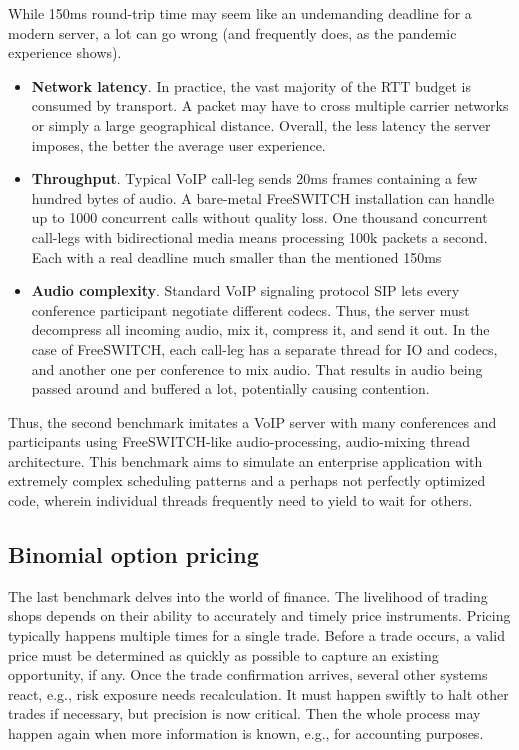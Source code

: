 \documentclass[12pt,a4paper,twoside]{report}
\begin{document}
While 150ms round-trip time may seem like an undemanding deadline for a modern server, a lot can go wrong (and frequently does, as the pandemic experience shows).  
\begin{itemize}
    \item \textbf{Network latency}. In practice, the vast majority of the RTT budget is consumed by transport. A packet may have to cross multiple carrier networks or simply a large geographical distance. Overall, the less latency the server imposes, the better the average user experience. 
    \item \textbf{Throughput}. Typical VoIP call-leg sends 20ms frames containing a few hundred bytes of audio. A bare-metal FreeSWITCH \cite{Maruzzelli2017-ou} installation can handle up to 1000 concurrent calls without quality loss. One thousand concurrent call-legs with bidirectional media means processing 100k packets a second. Each with a real deadline much smaller than the mentioned 150ms
    \item \textbf{Audio complexity}. Standard VoIP signaling protocol SIP lets every conference participant negotiate different codecs. Thus, the server must decompress all incoming audio, mix it, compress it, and send it out. In the case of FreeSWITCH, each call-leg has a separate thread for IO and codecs, and another one per conference to mix audio. That results in audio being passed around and buffered a lot, potentially causing contention.      
\end{itemize}

Thus, the second benchmark imitates a VoIP server with many conferences and participants using FreeSWITCH-like \cite{Maruzzelli2017-ou} audio-processing, audio-mixing thread architecture. This benchmark aims to simulate an enterprise application with extremely complex scheduling patterns and a perhaps not perfectly optimized code, wherein individual threads frequently need to yield to wait for others.

\subsection{Binomial option pricing}
\label{section:bench-option-pricing}

The last benchmark delves into the world of finance. The livelihood of trading shops depends on their ability to accurately and timely price instruments. Pricing typically happens multiple times for a single trade. Before a trade occurs, a valid price must be determined as quickly as possible to capture an existing opportunity, if any. Once the trade confirmation arrives, several other systems react, e.g., risk exposure needs recalculation. It must happen swiftly to halt other trades if necessary, but precision is now critical. Then the whole process may happen again when more information is known, e.g., for accounting purposes. 
\end{document}
